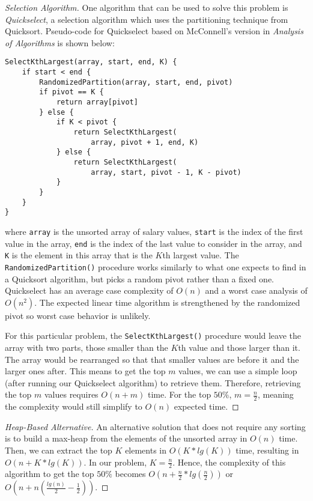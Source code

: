 \documentclass{scrartcl}
\begin{document}
\begin{flushleft}
\begin{proof}[Selection Algorithm]
        One algorithm that can be used to solve this problem is \textit{Quickselect}, a selection
        algorithm which uses the partitioning technique from Quicksort. Pseudo-code for Quickselect
        based on McConnell's version in \textit{Analysis of Algorithms} is shown below:
        \medskip
\begin{verbatim}
SelectKthLargest(array, start, end, K) {
    if start < end {
        RandomizedPartition(array, start, end, pivot)
        if pivot == K {
            return array[pivot]
        } else {
            if K < pivot {
                return SelectKthLargest(
                    array, pivot + 1, end, K)
            } else {
                return SelectKthLargest(
                    array, start, pivot - 1, K - pivot)
            }
        }
    }
}
\end{verbatim}
        where \verb|array| is the unsorted array of salary values, \verb|start| is the index of the
        first value in the array, \verb|end| is the index of the last value to consider in the
        array, and \verb|K| is the element in this array that is the $K$th largest value. The
        \verb|RandomizedPartition()| procedure works similarly to what one expects to find in a
        Quicksort algorithm, but picks a random pivot rather than a fixed one. Quickselect has an
        average case complexity of $O(n)$ and a worst case analysis of $O(n^2)$. The expected linear
        time algorithm is strengthened by the randomized pivot so worst case behavior is unlikely.
        \bigskip

        For this particular problem, the \verb|SelectKthLargest()| procedure would leave the array
        with two parts, those smaller than the $K$th value and those larger than it. The array would
        be rearranged so that that smaller values are before it and the larger ones after. This
        means to get the top $m$ values, we can use a simple loop (after running our Quickselect
        algorithm) to retrieve them. Therefore, retrieving the top $m$ values requires $O(n + m)$
        time. For the top $50\%$, $m = \frac{n}{2}$, meaning the complexity would still simplify to
        $O(n)$ expected time.
    \end{proof}
    \medskip
    \begin{proof}[Heap-Based Alternative]\let\qed\relax
        An alternative solution that does not require any sorting is to build a max-heap from the
        elements of the unsorted array in $O(n)$ time. Then, we can extract the top $K$ elements in
        $O(K * lg(K))$ time, resulting in $O(n + K * lg(K))$. In our problem, $K = \frac{n}{2}$.
        Hence, the complexity of this algorithm to get the top $50\%$ becomes $O(n + \frac{n}{2} *
        lg(\frac{n}{2}))$ or $ O(n + n (\frac{lg(n)}{2} - \frac{1}{2}))$.
    \end{proof}


\end{flushleft}
\end{document}

